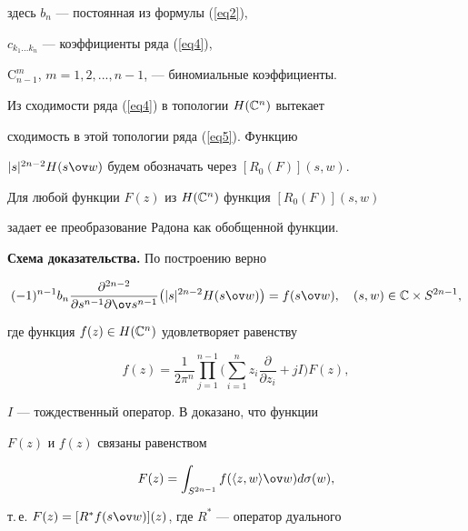 здесь $b_n$ --- постоянная из формулы (\ref{eq2}),


$c_{k_1\dotsc k_n}$ --- коэффициенты ряда (\ref{eq4}),


$\mathrm C^m_{n-1}$, $m=1,2,...,n-1$, --- биномиальные коэффициенты. 


Из сходимости ряда (\ref{eq4}) в топологии $H(\Bbb C^n)$ вытекает 


сходимость в этой топологии ряда (\ref{eq5}). Функцию


$|s|^{2n-2} H(s\ov w)$ будем обозначать через $[R_0(F)](s,w)$.








\begin{thm}


Для любой функции $F(z)$ из $ H(\Bbb C^n)$ функция $[R_0(F)](s,w)$ 


задает ее преобразование Радона как обобщенной функции.


\end{thm}








{\bf Схема доказательства.} По построению верно 


\begin{equation} \label{eq6}


(-1)^{n-1}b_n\frac{\partial ^{2n-2}}{\partial s^{n-1}\partial \ov s^{n-1}}


\big(|s|^{2n-2} H(s\ov w)\big)=f(s\ov w),\quad (s,w)\in\Bbb C\times S^{2n-1},


\end{equation}


где функция $f(z)\in H(\Bbb C^n)$ удовлетворяет равенству


$$


f(z)= \frac{1}{2\pi^n}\prod_{j=1}^{n-1}\bigg(\sum_{i=1}^{n}


z_i\frac{\partial }{\partial z_i}+jI\bigg)F(z),


$$


$I$ --- тождественный оператор. В \cite{SekM3} доказано, что функции


$F(z)$ и $f(z)$ связаны равенством 


$$


F(z)=\int_{S^{2n-1}}f(\la z,w\ra\ov w)d\sigma (w),


$$


т.\,е. $F(z)=[R^*f(s\ov w)](z)$, где $R^*$ --- оператор дуального 


